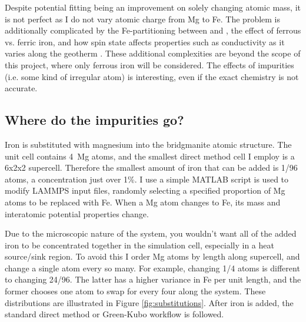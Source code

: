 Despite potential fitting being an improvement on solely changing atomic mass, it is not perfect as I do not vary atomic charge from Mg to Fe. The problem is additionally complicated by the Fe-partitioning between \mgsios and \mgo, the effect of ferrous vs. ferric iron, and how spin state affects properties such as conductivity as it varies along the geotherm \citep[e.g.][]{Ohta2017}. These additional complexities are beyond the scope of this project, where only ferrous iron will be considered. The effects of impurities (i.e. some kind of irregular atom) is interesting, even if the exact chemistry is not accurate.



\subsection{Where do the impurities go?} 

Iron is substituted with magnesium into the bridgmanite atomic structure. The unit cell contains 4~Mg atoms, and the smallest direct method cell I employ is a 6x2x2 supercell. Therefore the smallest amount of iron that can be added is 1/96 atoms, a concentration just over 1\%. I use a simple MATLAB script %
is used to modify LAMMPS input files, randomly selecting a specified proportion of Mg atoms to be replaced with Fe. When a Mg atom changes to Fe, its mass and interatomic potential properties change. 

Due to the microscopic nature of the system, you wouldn't want all of the added iron to be concentrated together in the simulation cell, especially in a heat source/sink region. To avoid this I order Mg atoms by length along supercell, and change a single atom every so many. For example, changing 1/4 atoms is different to changing 24/96. The latter has a higher variance in Fe per unit length, and the former chooses one atom to swap for every four along the system. These distributions are illustrated in Figure \ref{fig:substitutions}. After iron is added, the standard direct method or Green-Kubo workflow is followed.

